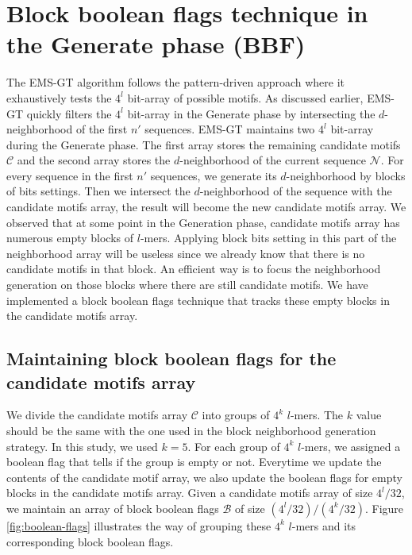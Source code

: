 \section{Block boolean flags technique in the Generate phase (BBF)}

The EMS-GT algorithm follows the pattern-driven approach where it exhaustively tests the $4^l$ bit-array of possible motifs. As discussed earlier, EMS-GT quickly filters the $4^l$ bit-array in the Generate phase by intersecting the $d$-neighborhood of the first $n'$ sequences. EMS-GT maintains two $4^l$ bit-array during the Generate phase. The first array stores the remaining candidate motifs $\mathcal{C}$ and the second array stores the $d$-neighborhood of the current sequence $\mathcal{N}$. For every sequence in the first $n'$ sequences, we generate its $d$-neighborhood by blocks of bits settings. Then we intersect the $d$-neighborhood of the sequence with the candidate motifs array, the result will become the new candidate motifs array. We observed that at some point in the Generation phase, candidate motifs array has numerous empty blocks of $l$-mers. Applying block bits setting in this part of the neighborhood array will be useless since we already know that there is no candidate motifs in that block. An efficient way is to focus the neighborhood generation on those blocks where there are still candidate motifs. We have implemented a block boolean flags technique that tracks these empty blocks in the candidate motifs array.

\subsection{Maintaining block boolean flags for the candidate motifs array}
We divide the candidate motifs array $\mathcal{C}$ into groups of $4^k$ $l$-mers. The $k$ value should be the same with the one used in the block neighborhood generation strategy. In this study, we used $k = 5$. For each group of $4^k$ $l$-mers, we assigned a boolean flag that tells if the group is empty or not. Everytime we update the contents of the candidate motif array, we also update the boolean flags for empty blocks in the candidate motifs array. Given a candidate motifs array of size $4^l/32$, we maintain an array of block boolean flags $\mathcal{B}$ of size $(4^l/32)/(4^k/32)$. Figure \ref{fig:boolean-flags} illustrates the way of grouping these $4^k$ $l$-mers and its corresponding block boolean flags.

